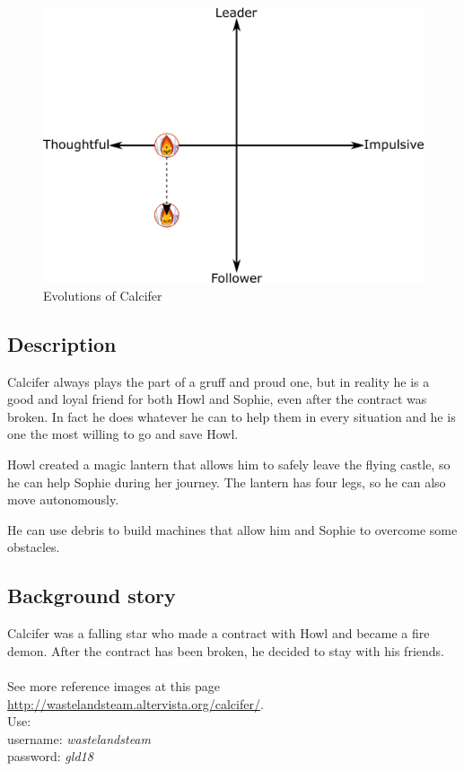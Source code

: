 \begin{figure}[H]
  \centering
   \includegraphics[width=14cm]{Images/Diagrams/Evolutions/calciferEvolution}
  \caption{Evolutions of Calcifer}
\end{figure}

\subsection{Description}
Calcifer always plays the part of a gruff and proud one, but in reality he is a good and loyal friend for both Howl and Sophie, even after the contract was broken. In fact he does whatever he can to help them in every situation and he is one the most willing to go and save Howl.

Howl created a magic lantern that allows him to safely leave the flying castle, so he can help Sophie during her journey. The lantern has four legs, so he can also move autonomously.

He can use debris to build machines that allow him and Sophie to overcome some obstacles.

\subsection{Background story}
Calcifer was a falling star who made a contract with Howl and became a fire demon. After the contract has been broken, he decided to stay with his friends.
\\\\
See more reference images at this page \href{http://wastelandsteam.altervista.org/calcifer/}{http://wastelandsteam.altervista.org/calcifer/}.\\
Use:\\
username: \textit{wastelandsteam}\\
password: \textit{gld18}
